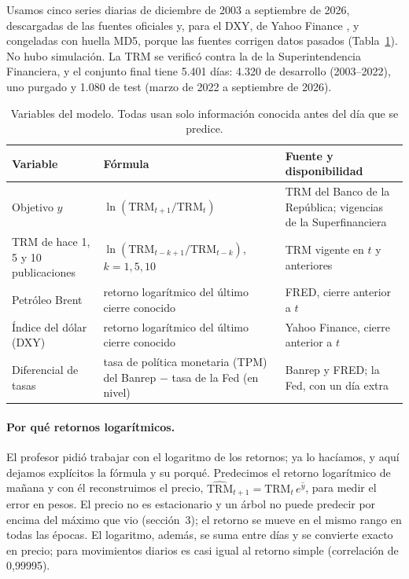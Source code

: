 \documentclass[11pt,letterpaper]{article}
\begin{document}
Usamos cinco series diarias de diciembre de 2003 a septiembre de 2026, descargadas de las fuentes oficiales y, para el DXY, de Yahoo Finance \cite{banrep,superfin,fred,yahoo-dxy}, y congeladas con huella MD5, porque las fuentes corrigen datos pasados (Tabla~\ref{tab:datos}). No hubo simulación. La TRM se verificó contra la de la Superintendencia Financiera, y el conjunto final tiene 5.401 días: 4.320 de desarrollo (2003--2022), uno purgado y 1.080 de test (marzo de 2022 a septiembre de 2026).

\begin{table}[!htbp]
\centering\footnotesize
\setlength{\tabcolsep}{4pt}
\caption{Variables del modelo. Todas usan solo información conocida antes del día que se predice.}
\label{tab:datos}
\begin{tabular}{>{\raggedright\arraybackslash}p{3.3cm}>{\raggedright\arraybackslash}p{5.2cm}>{\raggedright\arraybackslash}p{6.4cm}}
\toprule
Variable & Fórmula & Fuente y disponibilidad \\
\midrule
Objetivo $y$ & $\ln(\mathrm{TRM}_{t+1}/\mathrm{TRM}_t)$ & TRM del Banco de la República; vigencias de la Superfinanciera \\
TRM de hace 1, 5 y 10 publicaciones & $\ln(\mathrm{TRM}_{t-k+1}/\mathrm{TRM}_{t-k})$, $k=1,5,10$ & TRM vigente en $t$ y anteriores \\
Petróleo Brent & retorno logarítmico del último cierre conocido & FRED, cierre anterior a $t$ \\
Índice del dólar (DXY) & retorno logarítmico del último cierre conocido & Yahoo Finance, cierre anterior a $t$ \\
Diferencial de tasas & tasa de política monetaria (TPM) del Banrep $-$ tasa de la Fed (en nivel) & Banrep y FRED; la Fed, con un día extra \\
\bottomrule
\end{tabular}
\end{table}

\paragraph{Por qué retornos logarítmicos.} El profesor pidió trabajar con el logaritmo de los retornos; ya lo hacíamos, y aquí dejamos explícitos la fórmula y su porqué. Predecimos el retorno logarítmico de mañana y con él reconstruimos el precio, $\widehat{\mathrm{TRM}}_{t+1}=\mathrm{TRM}_t\,e^{\hat y}$, para medir el error en pesos. El precio no es estacionario y un árbol no puede predecir por encima del máximo que vio (sección~3); el retorno se mueve en el mismo rango en todas las épocas. El logaritmo, además, se suma entre días y se convierte exacto en precio; para movimientos diarios es casi igual al retorno simple (correlación de 0,99995).
\end{document}
